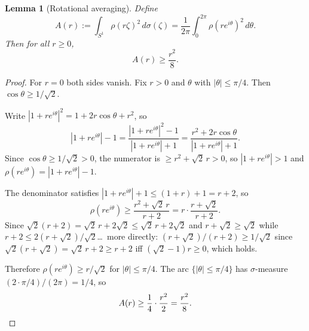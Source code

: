 \documentclass[11pt]{article}
\newtheorem{lemma}[theorem]{Lemma}
\newcommand{\rhof}{\rho}
\begin{document}
\begin{lemma}[Rotational averaging]\label{lem:avg}
Define
\[
  A(r) := \int_{S^1}\rhof(r\zeta)^2\,d\sigma(\zeta)
  = \frac{1}{2\pi}\int_0^{2\pi}\rhof(re^{i\theta})^2\,d\theta.
\]
Then for all $r \ge 0$,
\begin{equation}\label{eq:Alower}
  A(r) \ge \frac{r^2}{8}.
\end{equation}
\end{lemma}
\begin{proof}
For $r = 0$ both sides vanish.  Fix $r > 0$ and $\theta$ with $|\theta| \le \pi/4$.
Then $\cos\theta \ge 1/\sqrt{2}$.

Write $|1+re^{i\theta}|^2 = 1+2r\cos\theta+r^2$, so
\[
  |1+re^{i\theta}|-1
  = \frac{|1+re^{i\theta}|^2 - 1}{|1+re^{i\theta}|+1}
  = \frac{r^2+2r\cos\theta}{|1+re^{i\theta}|+1}.
\]
Since $\cos\theta \ge 1/\sqrt2 > 0$, the numerator is $\ge r^2 + \sqrt2\,r > 0$,
so $|1+re^{i\theta}| > 1$ and $\rhof(re^{i\theta}) = |1+re^{i\theta}|-1$.

The denominator satisfies $|1+re^{i\theta}|+1 \le (1+r)+1 = r+2$,
so
\[
  \rhof(re^{i\theta}) \ge \frac{r^2+\sqrt2\,r}{r+2}
  = r\cdot\frac{r+\sqrt2}{r+2}.
\]
Since $\sqrt2(r+2) = \sqrt2\,r+2\sqrt2 \le \sqrt2\,r+2\sqrt2$
and $r+\sqrt2 \ge \sqrt2$ while $r+2 \le 2(r+\sqrt2)/\sqrt2$\ldots\
more directly: $(r+\sqrt2)/(r+2) \ge 1/\sqrt2$
since $\sqrt2(r+\sqrt2) = \sqrt2\,r+2 \ge r+2$ iff $(\sqrt2-1)r \ge 0$, which holds.

Therefore $\rhof(re^{i\theta}) \ge r/\sqrt2$ for $|\theta|\le\pi/4$.
The arc $\{|\theta|\le\pi/4\}$ has $\sigma$-measure $(2\cdot\pi/4)/(2\pi) = 1/4$, so
\[
  A(r) \ge \frac{1}{4}\cdot\frac{r^2}{2} = \frac{r^2}{8}. \qedhere
\]
\end{proof}
\end{document}
